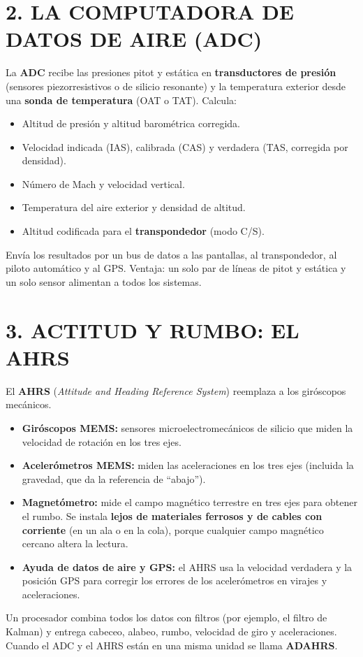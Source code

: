 \section*{2. LA COMPUTADORA DE DATOS DE AIRE (ADC)}

La \textbf{ADC} recibe las presiones pitot y estática en \textbf{transductores de presión}
(sensores piezorresistivos o de silicio resonante) y la temperatura exterior desde una
\textbf{sonda de temperatura} (OAT o TAT). Calcula:
\begin{itemize}
  \item Altitud de presión y altitud barométrica corregida.
  \item Velocidad indicada (IAS), calibrada (CAS) y verdadera (TAS, corregida por densidad).
  \item Número de Mach y velocidad vertical.
  \item Temperatura del aire exterior y densidad de altitud.
  \item Altitud codificada para el \textbf{transpondedor} (modo C/S).
\end{itemize}
Envía los resultados por un bus de datos a las pantallas, al transpondedor, al piloto automático y
al GPS. Ventaja: un solo par de líneas de pitot y estática y un solo sensor alimentan a todos los
sistemas.

\section*{3. ACTITUD Y RUMBO: EL AHRS}

El \textbf{AHRS} (\textit{Attitude and Heading Reference System}) reemplaza a los giróscopos
mecánicos.
\begin{itemize}
  \item \textbf{Giróscopos MEMS:} sensores microelectromecánicos de silicio que miden la velocidad
        de rotación en los tres ejes.
  \item \textbf{Acelerómetros MEMS:} miden las aceleraciones en los tres ejes (incluida la
        gravedad, que da la referencia de ``abajo'').
  \item \textbf{Magnetómetro:} mide el campo magnético terrestre en tres ejes para obtener el
        rumbo. Se instala \textbf{lejos de materiales ferrosos y de cables con corriente} (en un
        ala o en la cola), porque cualquier campo magnético cercano altera la lectura.
  \item \textbf{Ayuda de datos de aire y GPS:} el AHRS usa la velocidad verdadera y la posición GPS
        para corregir los errores de los acelerómetros en virajes y aceleraciones.
\end{itemize}
Un procesador combina todos los datos con filtros (por ejemplo, el filtro de Kalman) y entrega
cabeceo, alabeo, rumbo, velocidad de giro y aceleraciones. Cuando el ADC y el AHRS están en una
misma unidad se llama \textbf{ADAHRS}.

